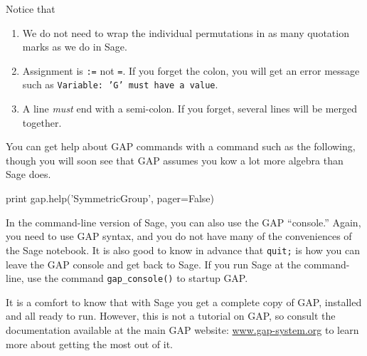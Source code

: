%
Notice that
%
\begin{enumerate}
\item We do not need to wrap the individual permutations in as many quotation marks as we do in Sage.
\item Assignment is \verb?:=? not \verb?=?.  If you forget the colon, you will get an error message such as \texttt{Variable: 'G' must have a value}.
\item A line \emph{must} end with a semi-colon.  If you forget, several lines will be merged together.
\end{enumerate}
%
You can get help about GAP commands with a command such as the following, though you will soon see that GAP assumes you kow a lot more algebra than Sage does.
%
\begin{sageverbatim}
print gap.help('SymmetricGroup', pager=False)
\end{sageverbatim}
%
In the command-line version of Sage, you can also use the GAP ``console.''  Again, you need to use GAP syntax, and you do not have many of the conveniences of the Sage notebook.  It is also good to know in advance that \verb?quit;? is how you can leave the GAP console and get back to Sage.  If you run Sage at the command-line, use the command \verb?gap_console()? to startup GAP.\par
%
It is a comfort to know that with Sage you get a complete copy of GAP, installed and all ready to run.  However, this is not a tutorial on GAP, so consult the documentation available at the main GAP website: \url{www.gap-system.org} to learn more about getting the most out of it.
%
\begin{sageverbatim}
\end{sageverbatim}
%

